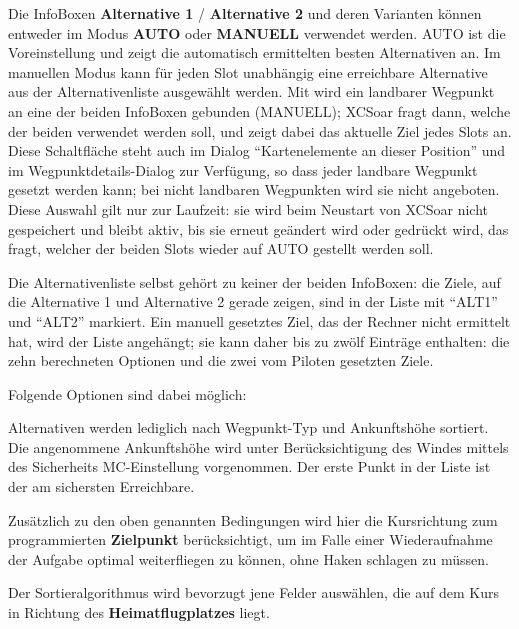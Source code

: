 Die InfoBoxen \textbf{Alternative 1} / \textbf{Alternative 2} und deren
Varianten können entweder im Modus \textbf{AUTO} oder \textbf{MANUELL}
verwendet werden. AUTO ist die Voreinstellung und zeigt die automatisch
ermittelten besten Alternativen an. Im manuellen Modus kann für jeden Slot
unabhängig eine erreichbare Alternative aus der Alternativenliste ausgewählt
werden. Mit  wird ein landbarer Wegpunkt an
eine der beiden InfoBoxen gebunden (MANUELL); \textsf{XCSoar} fragt dann,
welche der beiden verwendet werden soll, und zeigt dabei das aktuelle Ziel
jedes Slots an. Diese Schaltfläche steht auch im Dialog ``Kartenelemente an
dieser Position'' und im Wegpunktdetails-Dialog zur Verfügung, so dass jeder
landbare Wegpunkt gesetzt werden kann; bei nicht landbaren Wegpunkten wird sie
nicht angeboten.
Diese Auswahl gilt nur zur Laufzeit: sie wird beim Neustart von
\textsf{XCSoar} nicht gespeichert und bleibt aktiv, bis sie erneut geändert
wird oder  gedrückt wird, das fragt, welcher
der beiden Slots wieder auf AUTO gestellt werden soll.

Die Alternativenliste selbst gehört zu keiner der beiden InfoBoxen: die Ziele,
auf die Alternative 1 und Alternative 2 gerade zeigen, sind in der Liste mit
``ALT1'' und ``ALT2'' markiert. Ein manuell gesetztes Ziel, das der
Rechner nicht ermittelt hat, wird der Liste angehängt; sie kann daher bis zu
zwölf Einträge enthalten: die zehn berechneten Optionen und die zwei vom
Piloten gesetzten Ziele.

Folgende Optionen sind dabei möglich:
\begin{description}
\item[\p{Einfach}] Alternativen werden lediglich nach Wegpunkt-Typ und Ankunftshöhe sortiert.
Die angenommene Ankunftshöhe wird unter Berücksichtigung des Windes mittels des Sicherheits  MC-Einstellung vorgenommen.
Der erste Punkt in der Liste  ist der am sichersten Erreichbare.
\item[\p{Aufgabe}] Zusätzlich zu den oben genannten Bedingungen wird hier die Kursrichtung zum programmierten \textbf{Zielpunkt} berücksichtigt, um im Falle einer
Wiederaufnahme der Aufgabe optimal weiterfliegen zu können, ohne Haken schlagen zu müssen.
\item[\p{Heimat}] Der Sortieralgorithmus wird bevorzugt jene Felder auswählen, die auf dem Kurs in Richtung des \textbf{Heimatflugplatzes} liegt.
\end{description}

